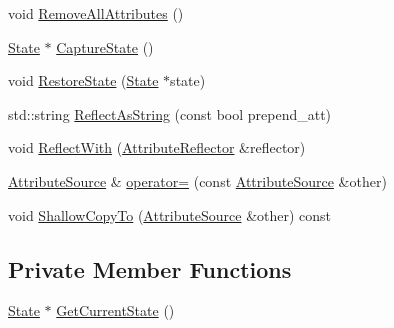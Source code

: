 \begin{DoxyCompactItemize}
\item 
void \mbox{\hyperlink{classlucene_1_1core_1_1util_1_1AttributeSource_af3f3c9582d3ac28feaa7a455fbb24b80}{Remove\+All\+Attributes}} ()
\item 
\mbox{\hyperlink{classlucene_1_1core_1_1util_1_1AttributeSource_1_1State}{State}} $\ast$ \mbox{\hyperlink{classlucene_1_1core_1_1util_1_1AttributeSource_adb86fb2ab1b48c7643cf7f0f641cb8ce}{Capture\+State}} ()
\item 
void \mbox{\hyperlink{classlucene_1_1core_1_1util_1_1AttributeSource_a1b58ab9c3125d5c6c05ed47e021d455c}{Restore\+State}} (\mbox{\hyperlink{classlucene_1_1core_1_1util_1_1AttributeSource_1_1State}{State}} $\ast$state)
\item 
std\+::string \mbox{\hyperlink{classlucene_1_1core_1_1util_1_1AttributeSource_a666406f74bc169662d4f54020ac7ddab}{Reflect\+As\+String}} (const bool prepend\+\_\+att)
\item 
void \mbox{\hyperlink{classlucene_1_1core_1_1util_1_1AttributeSource_a2c1c0eeec6866335e6b44e1fa83a97f9}{Reflect\+With}} (\mbox{\hyperlink{namespacelucene_1_1core_1_1util_a7dbb701adaed055f73fb95eec83da10a}{Attribute\+Reflector}} \&reflector)
\item 
\mbox{\hyperlink{classlucene_1_1core_1_1util_1_1AttributeSource}{Attribute\+Source}} \& \mbox{\hyperlink{classlucene_1_1core_1_1util_1_1AttributeSource_acc3081e1437b1c96ddc7671b5088c460}{operator=}} (const \mbox{\hyperlink{classlucene_1_1core_1_1util_1_1AttributeSource}{Attribute\+Source}} \&other)
\item 
void \mbox{\hyperlink{classlucene_1_1core_1_1util_1_1AttributeSource_a9fd48c63c575c5c69818d3697c17a9a3}{Shallow\+Copy\+To}} (\mbox{\hyperlink{classlucene_1_1core_1_1util_1_1AttributeSource}{Attribute\+Source}} \&other) const
\end{DoxyCompactItemize}
\subsection*{Private Member Functions}
\begin{DoxyCompactItemize}
\item 
\mbox{\hyperlink{classlucene_1_1core_1_1util_1_1AttributeSource_1_1State}{State}} $\ast$ \mbox{\hyperlink{classlucene_1_1core_1_1util_1_1AttributeSource_a7a8f566041a7140d8ff8d6bea8e45b0f}{Get\+Current\+State}} ()
\end{DoxyCompactItemize}
